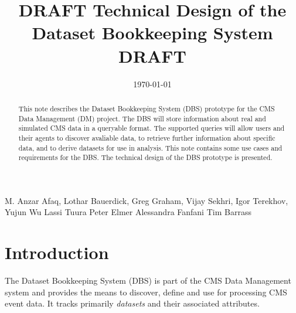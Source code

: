 \documentclass{cmspaper}
\begin{document}

\begin{titlepage}

   \date{\today}

  \title{DRAFT Technical Design of the Dataset Bookkeeping System DRAFT}


  \begin{Authlist}
    M. Anzar Afaq, Lothar Bauerdick, Greg Graham, Vijay Sekhri, Igor Terekhov, 
    Yujun Wu
    Lassi Tuura
    Peter Elmer
    Alessandra Fanfani
    Tim Barrass
  \end{Authlist}


  \begin{abstract}
      This note describes the Dataset Bookkeeping System (DBS) prototype for the 
  CMS Data Management (DM) project.  The DBS will
  store information about real and simulated CMS data in a queryable format. 
  The supported queries will allow users and their agents to discover avaliable 
  data, to retrieve further information about specific data, and to 
  derive datasets for use in analysis. This note contains some use cases 
  and requirements for the DBS.  The technical design of the DBS prototype
  is presented.
    \end{abstract} 

  
\end{titlepage}

\setcounter{page}{2}%

\section{Introduction}
\label{sec:intro}

The Dataset Bookkeeping System (DBS) is part of the CMS Data Management system
and provides the means to discover, define and use for processing CMS event 
data. It tracks primarily {\em datasets} and their associated attributes.
\end{document}

